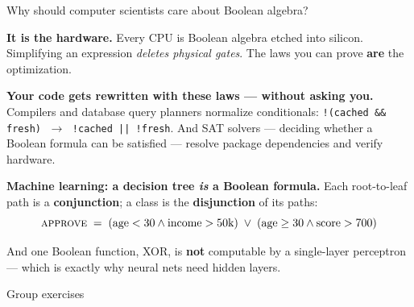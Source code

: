 \documentclass[10pt]{beamer}
\begin{document}
\begin{frame}{Why should computer scientists care about Boolean algebra?}
\footnotesize

\begin{evidence}[blue]
\textbf{It is the hardware.} Every CPU is Boolean algebra etched into silicon.
Simplifying an expression \emph{deletes physical gates}.  The laws you can prove
\textbf{are} the optimization.
\end{evidence}

\pause
\begin{evidence}[orange]
\textbf{Your code gets rewritten with these laws --- without asking you.}
Compilers and database query planners normalize conditionals:
\texttt{!(cached \&\& fresh)} $\;\to\;$ \texttt{!cached || !fresh}.
And \alert{SAT solvers} --- deciding whether a Boolean formula can be satisfied ---
resolve package dependencies and verify hardware.
\end{evidence}

\pause
\begin{evidence}[green]
\textbf{Machine learning: a decision tree \emph{is} a Boolean formula.}
Each root-to-leaf path is a \textbf{conjunction}; a class is the \textbf{disjunction} of its paths:
\vspace{-0.3em}
\[ \textsc{approve} \;=\; (\text{age} < 30 \land \text{income} > 50\text{k}) \;\lor\;
   (\text{age} \geq 30 \land \text{score} > 700) \]
\vspace{-0.8em}

\pause
And one Boolean function, \alert{XOR}, is \textbf{not} computable by a single-layer
perceptron --- which is exactly why neural nets need hidden layers.
\end{evidence}

\end{frame}

\begin{frame}[standout]
Group exercises
\end{frame}
\end{document}
